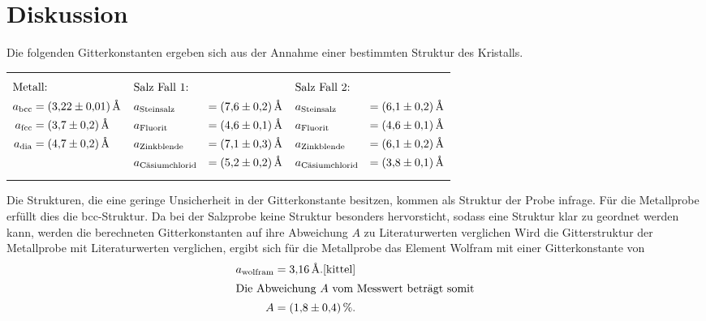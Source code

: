 \section{Diskussion}
\label{sec:Diskussion}
Die folgenden Gitterkonstanten ergeben sich aus der Annahme einer
bestimmten Struktur des Kristalls.
\begin{table}
  \centering
\begin{tabular}{p{} p{} p{} }
{\begin{align*}
\intertext{Metall:}
a_\mathrm{bcc}&=\SI{3.22(1)}{\angstrom}\\
a_\mathrm{fcc}&=\SI{3.7(2)}{\angstrom}\\
a_\mathrm{dia}&=\SI{4.7(2)}{\angstrom}
\end{align*}}
&
{\begin{align*}
\intertext{Salz Fall 1:}
&a_{\text{Steinsalz}}&=\SI{7.6(2)}{\angstrom}\\
&a_{\text{Fluorit}}&=\SI{4.6(1)}{\angstrom}\\
&a_{\text{Zinkblende}}&=\SI{7.1(3)}{\angstrom}\\
&a_{\text{Cäsiumchlorid}} &=\SI{5.2(2)}{\angstrom}
\end{align*}}
&
{\begin{align*}
\intertext{Salz Fall 2:}
&a_{\text{Steinsalz}}&=\SI{6.1(2)}{\angstrom}\\
&a_{\text{Fluorit}}&=\SI{4.6(1)}{\angstrom}\\
&a_{\text{Zinkblende}}&=\SI{6.1(2)}{\angstrom}\\
&a_{\text{Cäsiumchlorid}} &=\SI{3.8(1)}{\angstrom}
\end{align*}}
\end{tabular}
\end{table}
Die Strukturen, die eine geringe Unsicherheit in der Gitterkonstante besitzen,
kommen als Struktur der Probe infrage.
Für die Metallprobe erfüllt dies die bcc-Struktur.
Da bei der Salzprobe keine Struktur besonders hervorsticht, sodass
eine Struktur klar zu geordnet werden kann, werden die berechneten
Gitterkonstanten auf ihre Abweichung $A$ zu Literaturwerten verglichen
Wird die Gitterstruktur der Metallprobe mit Literaturwerten
verglichen, ergibt sich für die Metallprobe das Element
Wolfram mit einer Gitterkonstante von
\begin{align*}
a_{\text{wolfram}}=\SI{3.16}{\angstrom}.\text{\cite{kittel}} \\
\intertext{Die Abweichung $A$ vom Messwert beträgt somit}
A=\SI{1.8(4)}{\percent}.
\end{align*}
